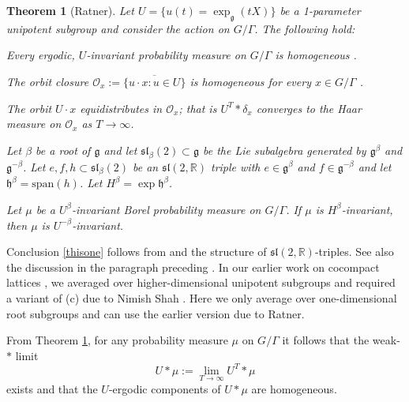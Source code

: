 \documentclass[10pt,reqno]{amsart}
\theoremstyle{Theorem}
\newtheorem{theorem}{Theorem} [section]
\theoremstyle{definition}
\theoremstyle{remark}
\newcommand{\R}{\mathbb {R}}
\def \sl{\mathfrak{sl}}
\def\orb{\mathcal O}
\newcommand{\lieg}{\mathfrak g}
\newcommand{\lieh}{\mathfrak h}
\def\vecm{\mathbf{m}}
\begin{document}
\begin{theorem}[Ratner]\label{thm:ratner}
Let $U = \{u(t) = \exp_\lieg (t X)\}$ be a 1-parameter unipotent subgroup and consider the action on $G/\Gamma$.  The following hold:
\begin{enumlemma}
	\item \label{ratner1}Every ergodic, $U$-invariant probability measure on $G/\Gamma$ is homogeneous \cite[Theorem 1]{MR1262705}.
	\item \label{ratner2} The orbit closure $\orb_x:= \overline{\{u \cdot x :u\in U\} }$ is homogeneous for every $x\in G/\Gamma$  \cite[Theorem 3]{MR1262705}.
	\item \label{ratner4} The orbit  ${U \cdot x }$ equidistributes in $\orb_x$; that is $U^T\ast \delta_x$ converges to the Haar  measure on $\orb_x$ as $T\to \infty$.

\item \label{ratner3} \label{thisone} Let $\beta$ be a root of $\lieg$ and let $\sl_\beta(2)\subset \lieg$ be the Lie subalgebra generated by $\lieg^\beta$ and $\lieg^{-\beta}$.  Let $e,f,h\subset \sl_\beta(2)$ be an $\sl(2,\R)$ triple with $e\in \lieg^\beta$ and $f\in \lieg^{-\beta}$ and let $\lieh^\beta = \mathrm{span} (h)$.  Let $H^\beta= \exp \lieh^\beta$.

Let $\mu$ be a   $U^{\beta}$-invariant Borel probability measure on $G/\Gamma$.
	If $\mu$ is $H^\beta$-invariant, then $\mu$ is $U^{-\beta}$-invariant.
\end{enumlemma}
\end{theorem}
Conclusion \ref{thisone} follows from \cite[Proposition 2.1]{MR1135878} and the structure of $\mathfrak{sl}(2,\R)$-triples. See also the discussion in the paragraph preceding  \cite[Theorem 9]{MR1262705}.  In our earlier work on cocompact lattices \cite{BFH}, we averaged over higher-dimensional unipotent subgroups and required
a variant of (c) due to Nimish Shah  \cite{MR1291701}.  Here we only average over one-dimensional root subgroups and can use the earlier version due to  Ratner.

From Theorem  \ref{thm:ratner}, for any probability measure $\mu$ on $G/\Gamma$ it follows
that   the weak-$*$ limit $$U\ast \mu:= \lim_{T\to \infty} U^T\ast \mu $$ exists and that the $U$-ergodic components of $U\ast \mu$ are  homogeneous.
\end{document}
